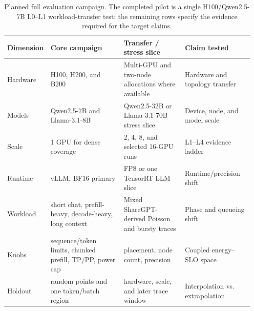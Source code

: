\begin{table}[t]
\centering
\caption{Planned full evaluation campaign.  The completed pilot is a single
H100/Qwen2.5-7B L0--L1 workload-transfer test; the remaining rows specify the
evidence required for the target claims.}
\label{tab:evaluation-matrix}
\scriptsize
\setlength{\tabcolsep}{3.5pt}
\renewcommand{\arraystretch}{1.1}
\begin{tabular}{p{}p{}p{}p{}}
\toprule
Dimension & Core campaign & Transfer / stress slice & Claim tested \\
\midrule
Hardware & H100, H200, and B200 & Multi-GPU and two-node allocations where available & Hardware and topology transfer \\
Models & Qwen2.5-7B and Llama-3.1-8B & Qwen2.5-32B or Llama-3.1-70B stress slice & Device, node, and model scale \\
Scale & 1 GPU for dense coverage & 2, 4, 8, and selected 16-GPU runs & L1--L4 evidence ladder \\
Runtime & vLLM, BF16 primary & FP8 or one TensorRT-LLM slice & Runtime/precision shift \\
Workload & short chat, prefill-heavy, decode-heavy, long context & Mixed ShareGPT-derived Poisson and bursty traces & Phase and queueing shift \\
Knobs & sequence/token limits, chunked prefill, TP/PP, power cap & placement, node count, precision & Coupled energy--SLO space \\
Holdout & random points and one token/batch region & hardware, scale, and later trace window & Interpolation vs. extrapolation \\
\bottomrule
\end{tabular}
\end{table}
